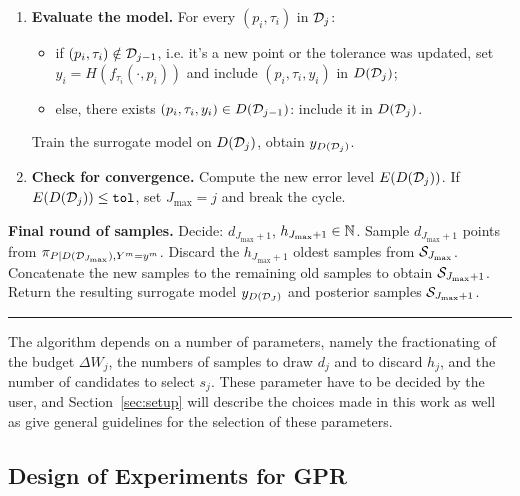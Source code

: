 \begin{enumerate}
    \item \textbf{Evaluate the model.} \newline
    For every $(p_i, \tau_i )$ in $\mathcal D_j$: \begin{itemize}[nosep]
        \item if $(p_i, \tau_i ) \notin \mathcal D_{j-1}$, i.e. it's a new point or the tolerance was updated, set $y_i = H(f_{\tau_i}(\cdot, p_i))$ and include $(p_i, \tau_i, y_i)$ in $D(\mathcal D_j)$;
        \item else, there exists $(p_i, \tau_i, y_i) \in D(\mathcal D_{j-1})$: include it in $D(\mathcal D_j)$.
    \end{itemize}
    Train the surrogate model on $D(\mathcal D_j)$, obtain $y_{D(\mathcal D_j)}$.

    \item \textbf{Check for convergence.} \newline
    Compute the new error level $E(D(\mathcal D_j))$. \newline
    If $E(D(\mathcal D_j)) \leq \texttt{tol}$, set $J_{\max} = j$ and break the cycle.
\end{enumerate}
\textbf{Final  round of samples.} \newline
Decide: $d_{J_{\max} + 1}$, $h_{J_{\max}+1} \in \mathbb N$. \newline
Sample $d_{J_{\max}+1}$ points from $\pi_{P \mid D(\mathcal D_{J_{\max}}), Y^m = y^m}$. \newline
Discard the $h_{J_{\max}+1}$ oldest samples from $\mathcal S_{J_{\max}}$. \newline
Concatenate the new samples to the remaining old samples to obtain $\mathcal S_{J_{\max}+1}$. \newline
Return the resulting surrogate model $y_{D(\mathcal D_J)}$ and posterior samples $\mathcal S_{J_{\max}+1}$.
\par\noindent\rule[3.5mm]{\textwidth}{0.4pt}

The algorithm depends on a number of parameters, namely the fractionating of the budget $\Delta W_j$, the numbers of samples to draw $d_j$ and to discard $h_j$, and the number of candidates to select $s_j$.
These parameter have to be decided by the user, and Section~\ref{sec:setup} will describe the choices made in this work as well as give general guidelines for the selection of these parameters. 

\subsection{Design of Experiments for GPR}\label{sec:GPAL}

